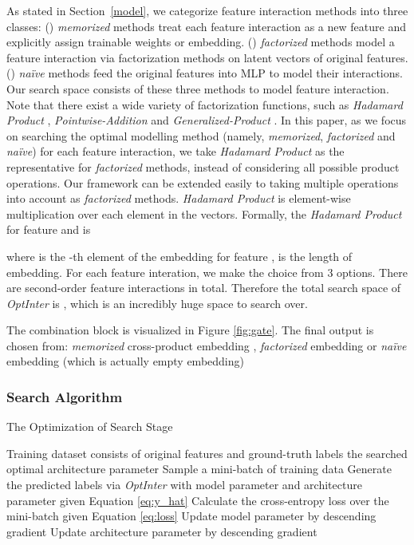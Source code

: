 \documentclass[conference]{IEEEtran}
\begin{document}
As stated in Section~\ref{model}, we categorize feature interaction methods into three classes: () \emph{memorized} methods treat each feature interaction as a new feature and explicitly assign trainable weights or embedding. () \emph{factorized} methods model a feature interaction via factorization methods on latent vectors of original features. () \emph{naïve} methods feed the original features into MLP to model their interactions. Our search space consists of these three methods to model feature interaction. Note that there exist a wide variety of factorization functions, such as \textit{Hadamard Product} , \textit{Pointwise-Addition}  and \textit{Generalized-Product} .
In this paper, as we focus on searching the optimal modelling method (namely, \emph{memorized}, \emph{factorized} and \emph{naïve}) for each feature interaction, we take \textit{Hadamard Product}  as the representative for \emph{factorized} methods, instead of considering all possible product operations. Our framework can be extended easily to taking multiple operations into account as \emph{factorized} methods. \textit{Hadamard Product} is element-wise multiplication over each element in the vectors. Formally, the \textit{Hadamard Product} for feature  and  is

where  is the -th element of the embedding for feature ,  is the length of embedding. For each feature interation, we make the choice from 3 options. There are  second-order feature interactions in total. Therefore the total search space of \textit{OptInter} is , which is an incredibly huge space to search over.

The combination block is visualized in Figure \ref{fig:gate}. The final output  is chosen from: \emph{memorized} cross-product embedding , \emph{factorized}  embedding  or \emph{naïve} embedding  (which is actually empty embedding)




\subsubsection{Search Algorithm}

\begin{algorithm}
	\caption{The Optimization of Search Stage} 
    \label{alg:search}
	\begin{algorithmic}[1]
		\Require Training dataset  consists of original features  and ground-truth labels 
        \Ensure the searched optimal architecture parameter 
            \State Sample a mini-batch of training data 
            \State Generate the predicted labels  via \textit{OptInter} with \Statex \qquad model parameter  and architecture parameter  
            \Statex \qquad given Equation \ref{eq:y_hat}
            \State Calculate the cross-entropy loss  over 
            \Statex \qquad the mini-batch given Equation \ref{eq:loss}
            \State Update model parameter  by descending gradient 
            \Statex \qquad 
            \State Update architecture parameter  by descending 
            \Statex \qquad gradient 
        \EndWhile
	\end{algorithmic}
\end{algorithm}
\end{document}
